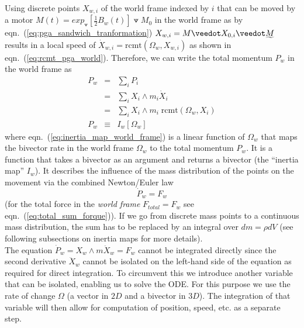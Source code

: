 Using discrete points $X_{w,i}$ of the world frame indexed by $i$ that can be moved by a
motor $M(t) = exp_\veedot[\frac{1}{2} B_w(t)] \veedot M_0$ in the world frame as by
eqn.~(\ref{eq:pga_sandwich_tranformation}) $X_{w,i} = M \veedot X_{0,i} \veedot \rrev{M}$
results in a local speed of $\dot{X}_{w,i} = \mathrm{rcmt}(\Omega_w,X_{w,i})$ as shown in
eqn.~(\ref{eq:rcmt_pga_world}). Therefore, we can write the total momentum $P_{w}$ in the
world frame as
\begin{eqnarray}
    P_{w} &=& \sum_i{P_i} \nonumber \\
          &=& \sum_i X_i \wedge m_i \dot{X}_i \nonumber \\
          &=& \sum_i X_i \wedge m_i \; \mathrm{rcmt}(\Omega_w,X_i) \nonumber \\
    P_{w} &\equiv& I_w[\Omega_w]
                \label{eq:inertia_map_world_frame}
\end{eqnarray}
where eqn.~(\ref{eq:inertia_map_world_frame}) is a linear function of $\Omega_w$ that
maps the bivector rate in the world frame $\Omega_w$ to the total momentum $P_w$. It is a
function that takes a bivector as an argument and returns a bivector (the ``inertia map''
$I_w$). It describes the influence of the mass distribution of the points on the movement
via the combined Newton/Euler law
\begin{equation}
    \dot{P}_{w}=F_{w}
    \label{eq:Newton_Euler_law}
\end{equation}
(for the total force in the \emph{world frame} $F_{total} = F_{w}$ see
eqn.~(\ref{eq:total_sum_forque})). If we go from discrete mass points to a continuous mass
distribution, the sum has to be replaced by an integral over $dm = \rho dV$ (see following
subsections on inertia maps for more details). \\

The equation $\dot{P}_{w} = X_w \wedge m \ddot{X}_w = F_{w}$ cannot be integrated directly
since the second derivative $\ddot{X}_w$ cannot be isolated on the left-hand side of the
equation as required for direct integration. To circumvent this we introduce another
variable that can be isolated, enabling us to solve the ODE. For this purpose we use the
rate of change $\Omega$ (a vector in $2D$ and a bivector in $3D$). The integration of that
variable will then allow for computation of position, speed, etc. as a separate step.

